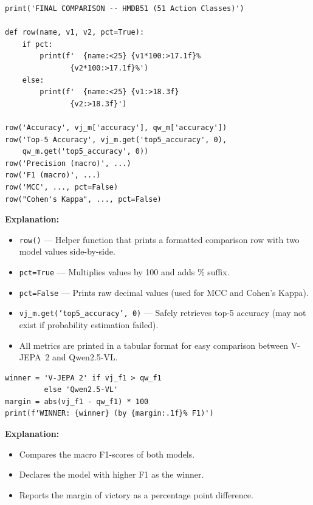 \documentclass[a4paper, 12pt]{article}
\newenvironment{explanation}{%
  \par\smallskip
  \noindent\textcolor{blue!70!black}{\textbf{Explanation:}}\\
  \noindent
}{\par\medskip}
\begin{document}
\begin{lstlisting}
print('FINAL COMPARISON -- HMDB51 (51 Action Classes)')

def row(name, v1, v2, pct=True):
    if pct:
        print(f'  {name:<25} {v1*100:>17.1f}%
               {v2*100:>17.1f}%')
    else:
        print(f'  {name:<25} {v1:>18.3f}
               {v2:>18.3f}')

row('Accuracy', vj_m['accuracy'], qw_m['accuracy'])
row('Top-5 Accuracy', vj_m.get('top5_accuracy', 0),
    qw_m.get('top5_accuracy', 0))
row('Precision (macro)', ...)
row('F1 (macro)', ...)
row('MCC', ..., pct=False)
row("Cohen's Kappa", ..., pct=False)
\end{lstlisting}

\begin{explanation}
\begin{itemize}[nosep]
  \item \texttt{row()} --- Helper function that prints a formatted comparison row with two model values side-by-side.
  \item \texttt{pct=True} --- Multiplies values by 100 and adds \% suffix.
  \item \texttt{pct=False} --- Prints raw decimal values (used for MCC and Cohen's Kappa).
  \item \texttt{vj\_m.get('top5\_accuracy', 0)} --- Safely retrieves top-5 accuracy (may not exist if probability estimation failed).
  \item All metrics are printed in a tabular format for easy comparison between V-JEPA~2 and Qwen2.5-VL.
\end{itemize}
\end{explanation}

\begin{lstlisting}
winner = 'V-JEPA 2' if vj_f1 > qw_f1
         else 'Qwen2.5-VL'
margin = abs(vj_f1 - qw_f1) * 100
print(f'WINNER: {winner} (by {margin:.1f}% F1)')
\end{lstlisting}

\begin{explanation}
\begin{itemize}[nosep]
  \item Compares the macro F1-scores of both models.
  \item Declares the model with higher F1 as the winner.
  \item Reports the margin of victory as a percentage point difference.
\end{itemize}
\end{explanation}
\end{document}
